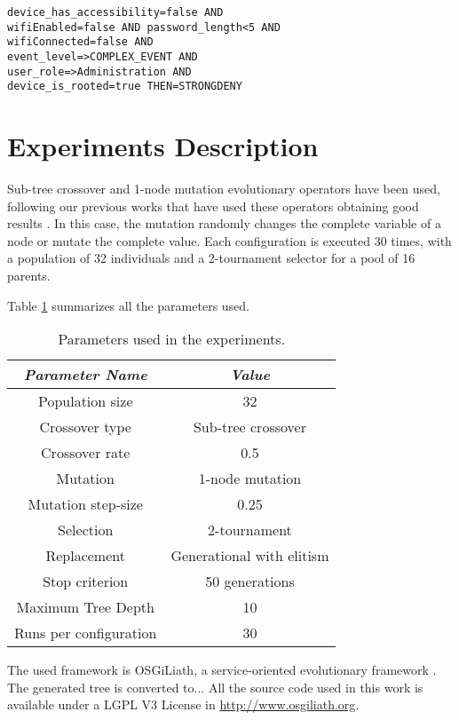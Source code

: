 \documentclass[a4paper,10pt,twocolumn,preprint,3p]{elsarticle}
\begin{document}
\begin{verbatim}
device_has_accessibility=false AND
wifiEnabled=false AND password_length<5 AND
wifiConnected=false AND
event_level=>COMPLEX_EVENT AND
user_role=>Administration AND
device_is_rooted=true THEN=STRONGDENY
\end{verbatim}


\section{Experiments Description}
\label{sec:experiments}

Sub-tree crossover and 1-node mutation evolutionary operators have been used, following our previous works that have used these operators obtaining good results \cite{CITAR_AQUI_EVOSTAR14GPBOT}. In this case, the mutation randomly changes the complete variable of a node or mutate the complete value. Each configuration is executed 30 times, with a population of 32 individuals and a 2-tournament selector for a pool of 16 parents.


Table \ref{tab:parameters} summarizes all the parameters used.

\begin{table}
\begin{center}
\begin{tabular}{|c|c|}
\hline
{\em Parameter Name} & {\em Value} \\\hline
Population size & 32 \\\hline
Crossover type & Sub-tree crossover \\ \hline
Crossover rate & 0.5\\ \hline
Mutation  & 1-node mutation\\ \hline
Mutation step-size & 0.25 \\ \hline
Selection & 2-tournament \\ \hline
Replacement & Generational with elitism\\ \hline
Stop criterion & 50 generations \\ \hline
Maximum Tree Depth & 10 \\ \hline %
Runs per configuration & 30 \\ \hline
\end{tabular}
\caption{Parameters used in the experiments.}
\label{tab:parameters}
\end{center}
\end{table}

The used framework is OSGiLiath, a service-oriented evolutionary framework \cite{Garcia13Service}. The generated tree is converted to...  All the source code used in this work is available under a LGPL V3 License in \url{http://www.osgiliath.org}.
\end{document}
